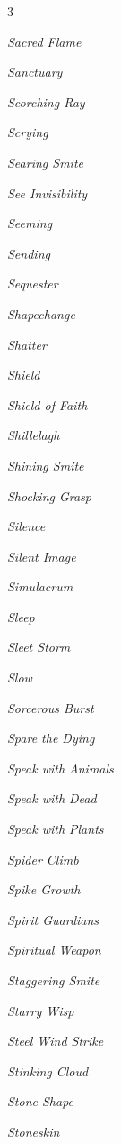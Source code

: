 \documentclass[10pt,a4paper,twoside,bg=print,twocolumn,openany,nodeprecatedcode]{dndbook}
\begin{document}
\begin{description}
\begin{multicols}{3}
\item \textit{Sacred Flame}
\item \textit{Sanctuary}
\item \textit{Scorching Ray}
\item \textit{Scrying}
\item \textit{Searing Smite}
\item \textit{See Invisibility}
\item \textit{Seeming}
\item \textit{Sending}
\item \textit{Sequester}
\item \textit{Shapechange}
\item \textit{Shatter}
\item \textit{Shield}
\item \textit{Shield of Faith}
\item \textit{Shillelagh}
\item \textit{Shining Smite}
\item \textit{Shocking Grasp}
\item \textit{Silence}
\item \textit{Silent Image}
\item \textit{Simulacrum}
\item \textit{Sleep}
\item \textit{Sleet Storm}
\item \textit{Slow}
\item \textit{Sorcerous Burst}
\item \textit{Spare the Dying}
\item \textit{Speak with Animals}
\item \textit{Speak with Dead}
\item \textit{Speak with Plants}
\item \textit{Spider Climb}
\item \textit{Spike Growth}
\item \textit{Spirit Guardians}
\item \textit{Spiritual Weapon}
\item \textit{Staggering Smite}
\item \textit{Starry Wisp}
\item \textit{Steel Wind Strike}
\item \textit{Stinking Cloud}
\item \textit{Stone Shape}
\item \textit{Stoneskin}

\end{multicols}
\end{description}
\end{document}

